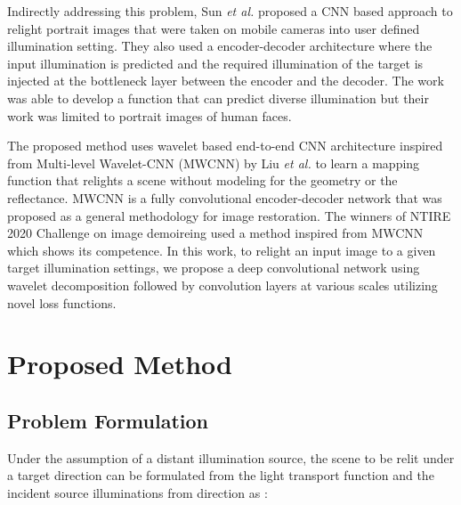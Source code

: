 \documentclass[runningheads]{llncs}
\newcommand{\etal}{\textit{et al. }}
\begin{document}
\par
Indirectly addressing this problem, Sun \etal proposed a CNN based approach \cite{Single_image_potrait_relighting}
to relight portrait images that were taken on mobile cameras into user defined
illumination setting. They also used a encoder-decoder architecture where the
input illumination is predicted and the required illumination of the target is injected
at the bottleneck layer between the encoder and the decoder. The work was able
to develop a function that can predict diverse illumination but their work was
limited to portrait images of human faces.
\par
The proposed method uses wavelet based end-to-end CNN architecture inspired
from Multi-level Wavelet-CNN (MWCNN) \cite{mwcnn} by Liu \etal to learn a mapping function
that relights a scene without modeling for the geometry or the reflectance. MWCNN is a fully convolutional encoder-decoder network that was proposed as a general methodology for image restoration. The winners of NTIRE 2020 Challenge on image demoireing \cite{NTIRE_2020_CVPR_Workshops} used a method inspired from MWCNN which shows its competence.
In this work, to relight an input image to a given target illumination settings, we propose a deep convolutional network using wavelet decomposition followed by convolution layers at various scales utilizing novel loss functions.

\nocite{vidit_based, light_transport, reflectance_modeling}

\section{Proposed Method}
\label{section:proposed_method}
\subsection{Problem Formulation}
\par Under the assumption of a distant illumination source, the scene to be relit under a target direction can be formulated from the light transport function  and the incident source illuminations from direction  as :
\end{document}
